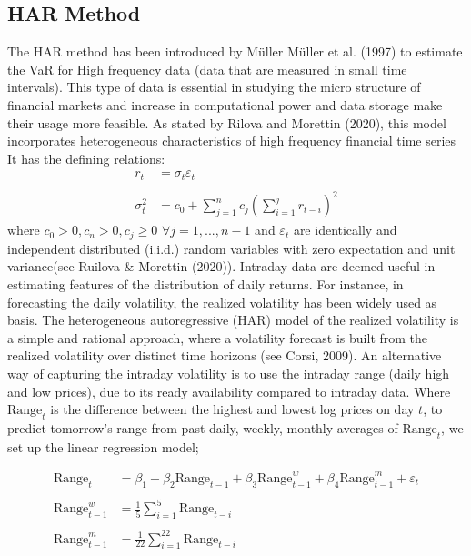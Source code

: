\documentclass[a4paper,11pt,oneside]{book}
\begin{document}
\subsection{HAR Method}
The HAR method has been introduced by Müller Müller et al. (1997) to estimate the VaR for High frequency data (data that are measured in small time intervals). This type of data is essential in studying the micro structure of financial markets and  increase in computational power and data storage make their usage more feasible. As stated by Rilova and Morettin (2020), this model incorporates
heterogeneous characteristics of high frequency financial time series It has the defining relations: 
\begin{equation}
\begin{aligned}
r_t &= \sigma_t\varepsilon_t
\\
\\
\sigma_t^2 &= c_0 + \sum_{j=1}^{n}c_j\left(\sum_{i=1}^{j}r_{t-i}\right)^2
\label{3}
\end{aligned}
\end{equation}
where $c_0>0, c_n > 0, c_j \ge 0$ $\forall j = 1,...,n-1$ and $\varepsilon_t$ are identically and independent distributed (i.i.d.) random variables with zero expectation and unit variance(see Ruilova \& Morettin (2020)).
\newline
\newline
Intraday data are deemed useful in estimating features of the distribution of daily returns. For
instance, in forecasting the daily volatility, the realized volatility has been widely used as basis. The heterogeneous autoregressive (HAR) model of the realized
volatility is a simple and rational approach, where a
volatility forecast is built from the realized volatility over distinct time horizons (see Corsi, 2009). An alternative way of
capturing the intraday volatility is to use the intraday range (daily high and low prices), due to its ready availability compared to  intraday data. Where $\text{Range}_{t}$
is the difference between the highest and
lowest log prices on day $t$, to predict tomorrow's range from past daily, weekly, monthly averages of $\text{Range}_{t}$, we set up the linear regression model;

\begin{equation}
\begin{aligned}
\text{Range}_{t}&=\beta_1+\beta_{2}\text{Range}_{t-1} + \beta_{3}\text{Range}^{w}_{t-1} + \beta_{4}\text{Range}^{m}_{t-1} + \varepsilon_t
\\
\\
\text{Range}^{w}_{t-1}&=\frac{1}{5}\sum_{i=1}^{5}\text{Range}_{t-i}
\\
\\
\text{Range}^{m}_{t-1}&=\frac{1}{22}\sum_{i=1}^{22}\text{Range}_{t-i}
\label{4}
\end{aligned}
\end{equation}
\end{document}
